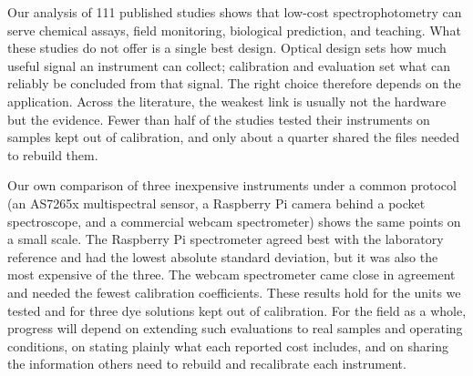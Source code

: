 Our analysis of 111 published studies shows that low-cost spectrophotometry can serve chemical assays, field monitoring, biological prediction, and teaching. What these studies do not offer is a single best design. Optical design sets how much useful signal an instrument can collect; calibration and evaluation set what can reliably be concluded from that signal. The right choice therefore depends on the application. Across the literature, the weakest link is usually not the hardware but the evidence. Fewer than half of the studies tested their instruments on samples kept out of calibration, and only about a quarter shared the files needed to rebuild them.

Our own comparison of three inexpensive instruments under a common protocol (an AS7265x multispectral sensor, a Raspberry Pi camera behind a pocket spectroscope, and a commercial webcam spectrometer) shows the same points on a small scale. The Raspberry Pi spectrometer agreed best with the laboratory reference and had the lowest absolute standard deviation, but it was also the most expensive of the three. The webcam spectrometer came close in agreement and needed the fewest calibration coefficients. These results hold for the units we tested and for three dye solutions kept out of calibration. For the field as a whole, progress will depend on extending such evaluations to real samples and operating conditions, on stating plainly what each reported cost includes, and on sharing the information others need to rebuild and recalibrate each instrument.
